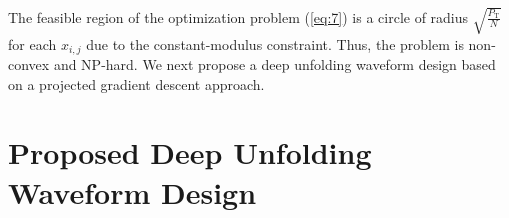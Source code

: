 \documentclass[conference]{IEEEtran}
\begin{document}
The feasible region of the optimization problem (\ref{eq:7}) is a circle of radius $ \sqrt{\frac{P_{\textrm{T}}}{N}} $ for each $ x_{i,j} $ due to the constant-modulus constraint. Thus, the problem is non-convex and NP-hard. %
We next propose a deep unfolding waveform design based on a projected gradient descent approach.

\section{Proposed Deep Unfolding Waveform Design}
\label{section:3}
\end{document}
